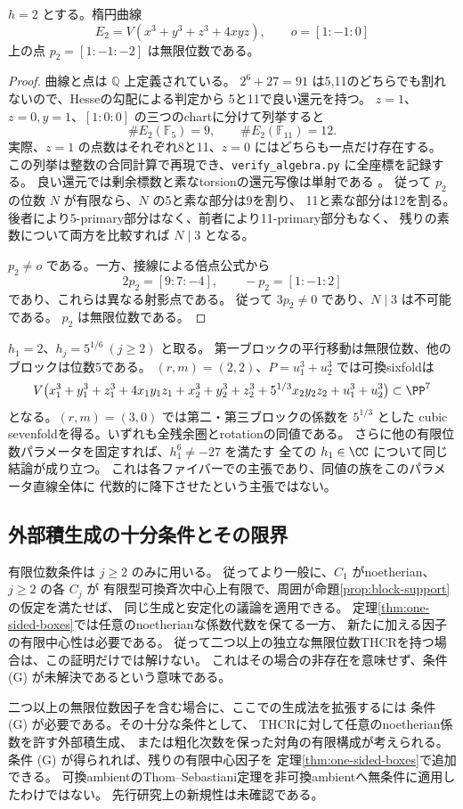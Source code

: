 \begin{lemma}[無限位数の明示的パラメータ]\label{lem:order-infinite}
 \(h=2\) とする。楕円曲線
 \[
 E_2=V(x^3+y^3+z^3+4xyz),\qquad o=[1:-1:0]
 \]
 上の点 \(p_2=[1:-1:-2]\) は無限位数である。
\end{lemma}
\begin{proof}
 曲線と点は \(\mathbb Q\) 上定義されている。
 \(2^6+27=91\) は5,11のどちらでも割れないので、Hesseの勾配による判定から
 5と11で良い還元を持つ。
 \(z=1\)、\(z=0,y=1\)、\([1:0:0]\) の三つのchartに分けて列挙すると
 \[
 \#E_2(\mathbb F_5)=9,\qquad \#E_2(\mathbb F_{11})=12.
 \]
 実際、\(z=1\) の点数はそれぞれ8と11、\(z=0\) にはどちらも一点だけ存在する。
 この列挙は整数の合同計算で再現でき、\texttt{verify\_algebra.py} に全座標を記録する。
 良い還元では剰余標数と素なtorsionの還元写像は単射である
 \cite[Reduction of torsion points]{SnowdenDVR}。
 従って \(p_2\) の位数 \(N\) が有限なら、\(N\) の5と素な部分は9を割り、
 11と素な部分は12を割る。後者により5-primary部分はなく、前者により11-primary部分もなく、
 残りの素数について両方を比較すれば \(N\mid3\) となる。

 \(p_2\ne o\) である。一方、接線による倍点公式から
 \[
 2p_2=[9:7:-4],\qquad -p_2=[1:-1:2]
 \]
 であり、これらは異なる射影点である。
 従って \(3p_2\ne0\) であり、\(N\mid3\) は不可能である。
 \(p_2\) は無限位数である。
\end{proof}

\begin{remark}[真に無限位数を含むsixfoldとsevenfold]
 \(h_1=2\)、\(h_j=5^{1/6}\ (j\ge2)\) と取る。
 第一ブロックの平行移動は無限位数、他のブロックは位数5である。
 \((r,m)=(2,2)\)、\(P=u_1^3+u_2^3\) では可換sixfoldは
 \[
 V\bigl(x_1^3+y_1^3+z_1^3+4x_1y_1z_1
       +x_2^3+y_2^3+z_2^3+5^{1/3}x_2y_2z_2+u_1^3+u_2^3\bigr)
 \subset\PP^7
 \]
 となる。\((r,m)=(3,0)\) では第二・第三ブロックの係数を \(5^{1/3}\) とした
 cubic sevenfoldを得る。いずれも全残余圏とrotationの同値である。
 さらに他の有限位数パラメータを固定すれば、\(h_1^6\ne-27\) を満たす
 全ての \(h_1\in\CC\) について同じ結論が成り立つ。
 これは各ファイバーでの主張であり、同値の族をこのパラメータ直線全体に
 代数的に降下させたという主張ではない。
\end{remark}

\subsection{外部積生成の十分条件とその限界}

有限位数条件は \(j\ge2\) のみに用いる。
従ってより一般に、\(C_1\) がnoetherian、\(j\ge2\) の各 \(C_j\) が
有限型可換斉次中心上有限で、周囲が命題\ref{prop:block-support}の仮定を満たせば、
同じ生成と安定化の議論を適用できる。
定理\ref{thm:one-sided-boxes}では任意のnoetherianな係数代数を保てる一方、
新たに加える因子の有限中心性は必要である。
従って二つ以上の独立な無限位数THCRを持つ場合は、この証明だけでは解けない。
これはその場合の非存在を意味せず、条件 (G) が未解決であるという意味である。

二つ以上の無限位数因子を含む場合に、ここでの生成法を拡張するには
条件 (G) が必要である。その十分な条件として、
THCRに対して任意のnoetherian係数を許す外部積生成、
または粗化次数を保った対角の有限構成が考えられる。
条件 (G) が得られれば、残りの有限中心因子を
定理\ref{thm:one-sided-boxes}で追加できる。
可換ambientのThom--Sebastiani定理を非可換ambientへ無条件に適用したわけではない。
先行研究上の新規性は未確認である。

